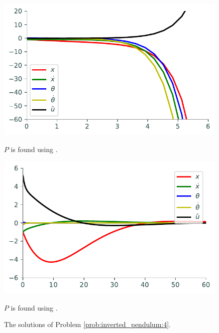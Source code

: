 \begin{figure}
\begin{minipage}[b]{.47\linewidth}
\centering
\includegraphics[width=\textwidth]{figures/prob4_unstable.pdf}
\caption*{$P$ is found using .}
\end{minipage}
\hspace{0.5cm}
\begin{minipage}[b]{0.47\linewidth}
\centering
\includegraphics[width=\textwidth]{figures/prob4_stable.pdf}
\caption*{$P$ is found using .}
\end{minipage}
\caption{The solutions of Problem \ref{prob:inverted_pendulum:4}.}
\label{fig:inverted_pendulum:4}
\end{figure}

